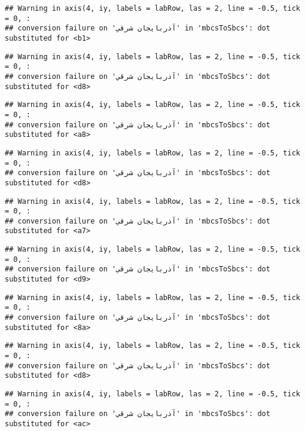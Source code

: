 \documentclass[
]{article}
\begin{document}
\begin{verbatim}
## Warning in axis(4, iy, labels = labRow, las = 2, line = -0.5, tick = 0, :
## conversion failure on 'آذربايجان شرقي' in 'mbcsToSbcs': dot substituted for <b1>
\end{verbatim}

\begin{verbatim}
## Warning in axis(4, iy, labels = labRow, las = 2, line = -0.5, tick = 0, :
## conversion failure on 'آذربايجان شرقي' in 'mbcsToSbcs': dot substituted for <d8>
\end{verbatim}

\begin{verbatim}
## Warning in axis(4, iy, labels = labRow, las = 2, line = -0.5, tick = 0, :
## conversion failure on 'آذربايجان شرقي' in 'mbcsToSbcs': dot substituted for <a8>
\end{verbatim}

\begin{verbatim}
## Warning in axis(4, iy, labels = labRow, las = 2, line = -0.5, tick = 0, :
## conversion failure on 'آذربايجان شرقي' in 'mbcsToSbcs': dot substituted for <d8>
\end{verbatim}

\begin{verbatim}
## Warning in axis(4, iy, labels = labRow, las = 2, line = -0.5, tick = 0, :
## conversion failure on 'آذربايجان شرقي' in 'mbcsToSbcs': dot substituted for <a7>
\end{verbatim}

\begin{verbatim}
## Warning in axis(4, iy, labels = labRow, las = 2, line = -0.5, tick = 0, :
## conversion failure on 'آذربايجان شرقي' in 'mbcsToSbcs': dot substituted for <d9>
\end{verbatim}

\begin{verbatim}
## Warning in axis(4, iy, labels = labRow, las = 2, line = -0.5, tick = 0, :
## conversion failure on 'آذربايجان شرقي' in 'mbcsToSbcs': dot substituted for <8a>
\end{verbatim}

\begin{verbatim}
## Warning in axis(4, iy, labels = labRow, las = 2, line = -0.5, tick = 0, :
## conversion failure on 'آذربايجان شرقي' in 'mbcsToSbcs': dot substituted for <d8>
\end{verbatim}

\begin{verbatim}
## Warning in axis(4, iy, labels = labRow, las = 2, line = -0.5, tick = 0, :
## conversion failure on 'آذربايجان شرقي' in 'mbcsToSbcs': dot substituted for <ac>
\end{verbatim}
\end{document}
